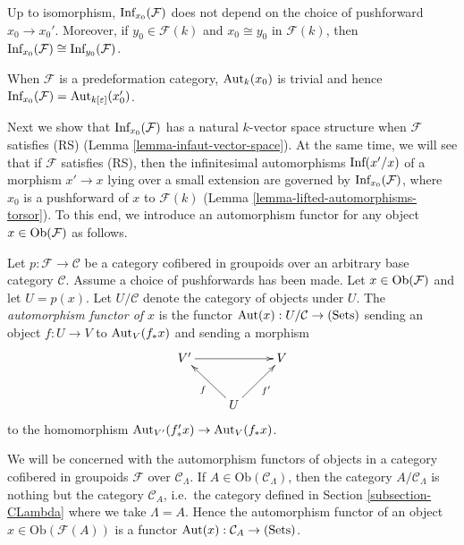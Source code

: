\begin{remark}
\label{remark-choice-pushforward-immaterial-infinitesimal-aut}
Up to isomorphism, $\textnormal{Inf}_{x_0}(\mathcal F)$ does not depend on the 
choice of pushforward $x_0 \rightarrow x_0'$.  Moreover, if $y_0 \in \mathcal 
F(k)$ and $x_0 \cong y_0$ in $\mathcal F(k)$, then 
$\textnormal{Inf}_{x_0}(\mathcal F) \cong \textnormal{Inf}_{y_0}(\mathcal F)$.
\end{remark}

\begin{remark}
\label{remark-trivial-aut-point}
When $\mathcal F$ is a predeformation category, $\textnormal{Aut}_{k}(x_0)$ is 
trivial and hence $\textnormal{Inf}_{x_0}(\mathcal F) = 
\textnormal{Aut}_{k[\varepsilon]}(x'_0)$.
\end{remark}

\noindent
Next we show that $\textnormal{Inf}_{x_0}(\mathcal F)$ has a natural $k$-vector 
space structure when $\mathcal F$ satisfies (RS) (Lemma 
\ref{lemma-infaut-vector-space}).  At the same time, we will see that if 
$\mathcal F$ satisfies (RS), then the infinitesimal automorphisms 
$\textnormal{Inf}(x'/x)$ of a morphism $x' \rightarrow x$ lying over a small 
extension are governed by $\textnormal{Inf}_{x_0}(\mathcal F)$, where $x_0$ is 
a pushforward of $x$ to $\mathcal F(k)$ (Lemma 
\ref{lemma-lifted-automorphisms-torsor}).  To this end, we introduce an 
automorphism functor for any object $x \in \textnormal{Ob}(\mathcal F)$ as 
follows.

\begin{definition}
\label{definition-automorphism-functor}
Let $p: \mathcal F \rightarrow \mathcal C$ be a category cofibered in groupoids 
over an arbitrary base category $\mathcal C$. Assume a choice of pushforwards 
has been made.  Let $x \in \textnormal{Ob}(\mathcal F)$ and let $U = p(x)$.  
Let $U/\mathcal C$ denote the category of objects under $U$. The 
{\it automorphism functor of $x$} is the functor $\textnormal{Aut}(x): 
U/\mathcal C \rightarrow \textnormal{(Sets)}$ sending an object $f: U 
\rightarrow V$ to $\textnormal{Aut}_{V}(f_*x)$ and sending a morphism
\[
\xymatrix{
V' \ar[rr] &                    & V\\
          & U \ar[ul]^{f}  \ar[ur]_{f'} & 
}
\]
to the homomorphism $\textnormal{Aut}_{V'}(f'_*x) \rightarrow 
\textnormal{Aut}_{V}(f_*x)$.
\end{definition}

\noindent 
We will be concerned with the automorphism functors of objects in a category 
cofibered in groupoids $\mathcal F$ over $\mathcal C_{\Lambda}$.  If $A \in 
\text{Ob}(\mathcal C_{\Lambda})$, then the category $A/\mathcal C_{\Lambda}$ is 
nothing but the category $\mathcal C_{A}$, i.e.\ the category defined in 
Section \ref{subsection-CLambda} where we take $\Lambda = A$.  Hence the 
automorphism functor of an object $x \in \text{Ob}(\mathcal F(A))$ is a functor 
$\textnormal{Aut}(x): \mathcal C_{A} \rightarrow \textnormal{(Sets)}$.

